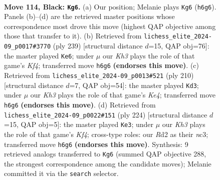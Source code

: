 \documentclass[11pt]{article}
\begin{document}
\clearpage

\begin{figure}[p]\centering
\begin{subfigure}{0.46\textwidth}\centering
\resizebox{\linewidth}{!}{%
\newchessgame
\chessboard[
  setfen={7R/6p1/5p1k/7p/N6P/6PK/3r4/8 b - - 53 114},
  showmover=false,
  pgfstyle=straightmove, color=movearrow, markmove={h6-g6}
]}
\caption{}
\end{subfigure}\hfill
\begin{subfigure}{0.46\textwidth}\centering
\resizebox{\linewidth}{!}{%
\newchessgame
\chessboard[
  setfen={8/8/6p1/5k1p/7P/5RPK/3r4/8 b - - 77 120},
  showmover=false,
  pgfstyle=straightmove, color=movearrow, markmove={f5-e6}
]}
\caption{}
\end{subfigure}
\\[4pt]
\begin{subfigure}{0.46\textwidth}\centering
\resizebox{\linewidth}{!}{%
\newchessgame
\chessboard[
  setfen={8/2R5/6pk/7p/1r2K2P/5PP1/8/8 w - - 21 106},
  showmover=false,
  pgfstyle=straightmove, color=movearrow, markmove={e4-d3}
]}
\caption{}
\end{subfigure}\hfill
\begin{subfigure}{0.46\textwidth}\centering
\resizebox{\linewidth}{!}{%
\newchessgame
\chessboard[
  setfen={8/5k2/6p1/4P2p/3N1K1P/2n3P1/8/8 w - - 33 113},
  showmover=false,
  pgfstyle=straightmove, color=movearrow, markmove={f4-e3}
]}
\caption{}
\end{subfigure}
\caption{\textbf{Move 114, Black: \texttt{Kg6}.} (a) Our position; Melanie plays \texttt{Kg6} (\texttt{h6g6}). Panels (b)--(d) are the retrieved master positions whose correspondence most drove this move (highest QAP objective among those that transfer to it). (b) Retrieved from \texttt{lichess\_elite\_2024-09\_p0017\#3770} (ply 239) [structural distance $d$=15, QAP obj=76]: the master played \texttt{Ke6}; under $\mu$ our \emph{Kh3} plays the role of that game's \emph{Kf4}; transferred move \texttt{h6g6} \textbf{(endorses this move)}. (c) Retrieved from \texttt{lichess\_elite\_2024-09\_p0013\#521} (ply 210) [structural distance $d$=7, QAP obj=54]: the master played \texttt{Kd3}; under $\mu$ our \emph{Kh3} plays the role of that game's \emph{Ke4}; transferred move \texttt{h6g6} \textbf{(endorses this move)}. (d) Retrieved from \texttt{lichess\_elite\_2024-09\_p0022\#151} (ply 224) [structural distance $d$=15, QAP obj=5]: the master played \texttt{Ke3}; under $\mu$ our \emph{Kh3} plays the role of that game's \emph{Kf4}; cross-type roles: our \emph{R}d2 as their \emph{n}c3; transferred move \texttt{h6g6} \textbf{(endorses this move)}. Synthesis: 9 retrieved analogs transferred to \texttt{Kg6} (summed QAP objective 288, the strongest correspondence among the candidate moves); Melanie committed it via the \texttt{search} selector.}
\label{fig:thought-m227}
\end{figure}
\end{document}
